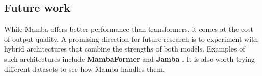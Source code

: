 \documentclass[conference]{IEEEtran}
\begin{document}
\subsection{Future work}
While Mamba offers better performance than transformers, it comes at the cost of output quality. A promising direction for future research is to experiment with hybrid architectures that combine the strengths of both models. Examples of such architectures include \textbf{MambaFormer} \cite{mambaformer} and \textbf{Jamba} \cite{jamba}. It is also worth trying different datasets to see how Mamba handles them.





\vspace{12pt}
\end{document}
